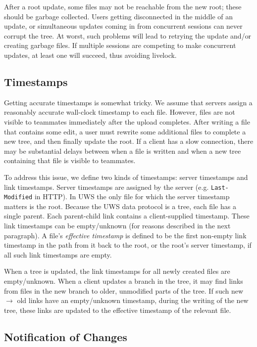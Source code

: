 \documentclass[runningheads]{llncs}
\begin{document}
After a root update, some files may not be reachable from the new root; these should be garbage collected.
Users getting disconnected in the middle of an update, or simultaneous updates coming in from concurrent sessions can never corrupt the tree.
At worst, such problems will lead to retrying the update and{\slash}or creating garbage files.
If multiple sessions are competing to make concurrent updates, at least one will succeed, thus avoiding livelock.

\subsection{Timestamps}

Getting accurate timestamps is somewhat tricky.
We assume that servers assign a reasonably accurate wall-clock timestamp to each file.
However, files are not visible to teammates immediately after the upload completes.
After writing a file that contains some edit, a user must rewrite some additional files to complete a new tree, and then finally update the root.
If a client has a slow connection, there may be substantial delays between when a file is written and when a new tree containing that file is visible to teammates.

To address this issue, we define two kinds of timestamps: server timestamps and link timestamps.
Server timestamps are assigned by the server (e.g. \texttt{Last- Modified} in HTTP).
In UWS the only file for which the server timestamp matters is the root.
Because the UWS data protocol is a tree, each file has a single parent.
Each parent-child link contains a client-supplied timestamp.
These link timestamps can be empty{\slash}unknown (for reasons described in the next paragraph).
A file's \emph{effective timestamp} is defined to be the first non-empty link timestamp in the path from it back to the root, or the root's server timestamp, if all such link timestamps are empty.

When a tree is updated, the link timestamps for all newly created files are empty{\slash}unknown.
When a client updates a branch in the tree, it may find links from files in the new branch to older, unmodified parts of the tree.
If such new $\rightarrow$ old links have an empty{\slash}unknown timestamp, during the writing of the new tree, these links are updated to the effective timestamp of the relevant file.

\subsection{Notification of Changes}
\end{document}
